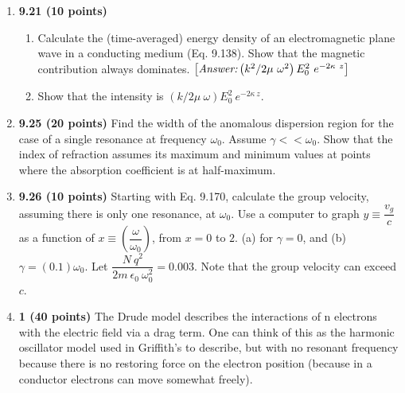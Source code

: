 \documentclass[fleqn]{article}
\begin{document}
  \begin{enumerate}
    \item \textbf{9.21 (10 points)}
    \begin{enumerate}
      \item Calculate the (time-averaged) energy density of an electromagnetic plane wave in a conducting medium (Eq. 9.138). 
      Show that the magnetic contribution always dominates. 
      $\left[\emph{Answer:} \left(k^2/2 \mu ~ \omega^2\right)E^2_0 ~ e^{-2 \kappa ~ z}\right]$



      \item Show that the intensity is $\left(k/2 \mu ~ \omega\right)E^2_0 ~ e^{-2 \kappa ~ z}$.
  

    \end{enumerate}
    

    \item \textbf{9.25 (20 points)} Find the width of the anomalous dispersion region for the case of a single resonance at 
    frequency $\omega_0$. Assume $\gamma << \omega_0$. Show that the index of refraction assumes its maximum and minimum values at points where the absorption
    coefficient is at half-maximum.

    
    \item \textbf{9.26 (10 points)} Starting with Eq. 9.170, calculate the group velocity, assuming there
    is only one resonance, at $\omega_0$.  Use a computer to graph $y \equiv \dfrac{v_g}{c}$ as a function of 
    $x \equiv \left(\dfrac{\omega}{\omega_0}\right)$, from $x=0$ to $2$. (a) for $\gamma=0$, and (b) $\gamma=\left(0.1\right) \omega_0$. 
    Let $\dfrac{N ~ q^2}{2 m ~ \epsilon_0 ~ \omega^2_0}=0.003$. Note that the group velocity can exceed $c$.


    
    \item \textbf{1 (40 points)} The Drude model describes the interactions of n electrons with the electric field via a drag term. One 
    can think of this as the harmonic oscillator model used in Griffith’s to describe, but with no resonant frequency because there is no 
    restoring force on the electron position (because in a conductor electrons can move somewhat freely).


\end{enumerate}
\end{document}
